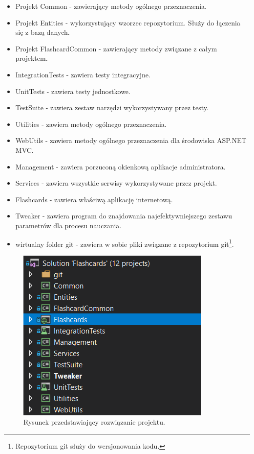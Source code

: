 \begin{itemize}
	\item Projekt Common - zawierający metody ogólnego przeznaczenia.
	\item Projekt Entities - wykorzystujący wzorzec repozytorium. Służy do łączenia się z bazą danych.
	\item Projekt FlashcardCommon - zawierający metody związane z całym projektem.
	\item IntegrationTests - zawiera testy integracyjne.
	\item UnitTests - zawiera testy jednostkowe.
	\item TestSuite - zawiera zestaw narzędzi wykorzystywany przez testy. 
	\item Utilities - zawiera metody ogólnego przeznaczenia. 
	\item WebUtils - zawiera metody ogólnego przeznaczenia dla środowiska ASP.NET MVC.
	\item Management - zawiera porzuconą okienkową aplikacje administratora.
	\item Services - zawiera wszystkie serwisy wykorzystywane przez projekt.
	\item Flashcards - zawiera właściwą aplikację internetową.
	\item Tweaker - zawiera program do znajdowania najefektywniejszego zestawu parametrów dla procesu nauczania.
	\item wirtualny folder git - zawiera w sobie pliki związane z repozytorium git\footnote{Repozytorium git służy do wersjonowania kodu.}.
\end{itemize}

\begin{figure}[h]
	\centering
	\includegraphics{images/Solution.png}
	 \caption{Rysunek przedstawiający rozwiązanie projektu.}
\end{figure}

